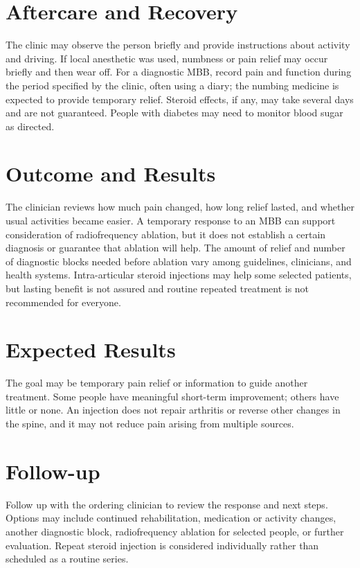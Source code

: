 \section*{Aftercare and Recovery}
The clinic may observe the person briefly and provide instructions about activity and driving. If local anesthetic was used, numbness or pain relief may occur briefly and then wear off. For a diagnostic MBB, record pain and function during the period specified by the clinic, often using a diary; the numbing medicine is expected to provide temporary relief. Steroid effects, if any, may take several days and are not guaranteed. People with diabetes may need to monitor blood sugar as directed.

\section*{Outcome and Results}
The clinician reviews how much pain changed, how long relief lasted, and whether usual activities became easier. A temporary response to an MBB can support consideration of radiofrequency ablation, but it does not establish a certain diagnosis or guarantee that ablation will help. The amount of relief and number of diagnostic blocks needed before ablation vary among guidelines, clinicians, and health systems. Intra-articular steroid injections may help some selected patients, but lasting benefit is not assured and routine repeated treatment is not recommended for everyone.

\section*{Expected Results}
The goal may be temporary pain relief or information to guide another treatment. Some people have meaningful short-term improvement; others have little or none. An injection does not repair arthritis or reverse other changes in the spine, and it may not reduce pain arising from multiple sources.

\section*{Follow-up}
Follow up with the ordering clinician to review the response and next steps. Options may include continued rehabilitation, medication or activity changes, another diagnostic block, radiofrequency ablation for selected people, or further evaluation. Repeat steroid injection is considered individually rather than scheduled as a routine series.

